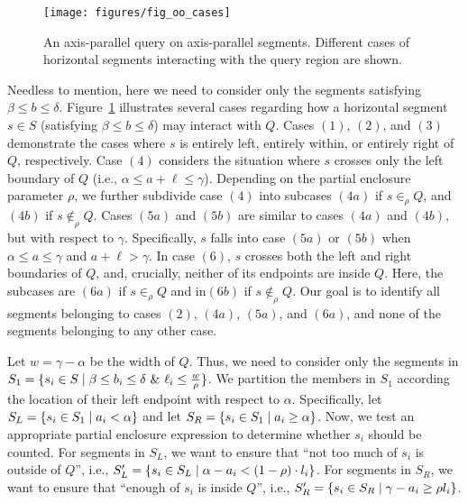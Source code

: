 \begin{figure}[t]
\centering
\texttt{[image: figures/fig\_oo\_cases]}
\caption{An axis-parallel query on axis-parallel segments. Different cases 
of horizontal segments interacting with the query region are shown.}
\label{:fig:rectangles:ap:cases}
\end{figure}

Needless to mention, here we need to consider only the segments 
satisfying $\beta \leq b \leq \delta$. 
Figure~\ref{:fig:rectangles:ap:cases} illustrates several cases 
regarding how a horizontal segment $s \in S$ (satisfying $\beta 
\leq b \leq \delta$) may interact with $Q$. 
Cases $(1)$, $(2)$, and $(3)$ demonstrate the cases where $s$ is 
entirely left, entirely within, or entirely right of $Q$, 
respectively. Case $(4)$ considers the situation where $s$ crosses 
only the left boundary of $Q$ (i.e., $\alpha \leq a+\ell \leq \gamma$). 
Depending on the partial enclosure parameter $\rho$, we further 
subdivide case $(4)$ into subcases $(4a)$ if $s \in_\rho Q$, and 
$(4b)$ if $s \not \in_\rho Q$. Cases $(5a)$ and $(5b)$ are similar 
to cases $(4a)$ and $(4b)$, but with respect to $\gamma$. Specifically, 
$s$ falls into case $(5a)$ or $(5b)$ when $\alpha \leq a \leq \gamma$ 
and $a+\ell > \gamma$. In case $(6)$, $s$ crosses both the left and right 
boundaries of $Q$, and, crucially, neither of its endpoints are inside $Q$. 
Here, the subcases are $(6a)$ if $s \in_\rho Q$ and in$(6b)$ if $s \not 
\in_\rho Q$. Our goal is to identify all segments belonging to cases 
$(2)$, $(4a)$, $(5a)$, and $(6a)$, and none of the segments belonging 
to any other case.

Let $w = \gamma - \alpha$ be the width of $Q$. Thus, we need to consider 
only the segments in $S_1 = \{s_i \in S \;|\; \beta \leq b_i \leq \delta 
~\&~ \ell_i \leq \frac{w}{\rho}\}$.  We partition the members in $S_1$ 
according the location of their left endpoint with respect to $\alpha$. 
Specifically, let $S_L = \{s_i \in S_1 \;|\; a_i < \alpha\}$ and let 
$S_R = \{s_i \in S_1 \;|\; a_i \geq \alpha\}$.
Now, we test an appropriate partial enclosure expression to determine 
whether $s_i$ should be counted. For segments in $S_L$, we want to 
ensure that ``not too much of $s_i$ is outside of $Q$'', i.e., $S_L' 
= \{ s_i \in S_L \;|\; \alpha - a_i < (1 - \rho) \cdot l_i\}$. 
For segments in $S_R$, we want to ensure that ``enough of $s_i$ is inside 
$Q$'', i.e., $S_R' = \{s_i \in S_R \;|\; \gamma - a_i \geq  \rho l_i\}$.


